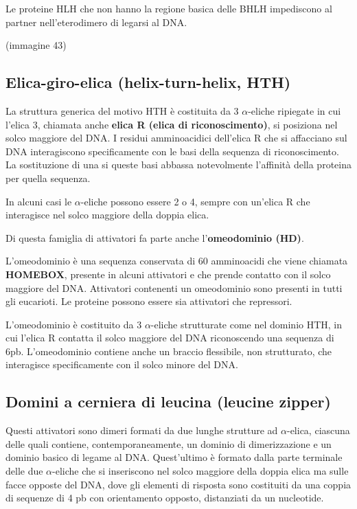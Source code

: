 \documentclass[11pt]{book}
\begin{document}
Le proteine HLH che non hanno la regione basica delle BHLH impediscono
al partner nell'eterodimero di legarsi al DNA.

(immagine 43)

\subsection{Elica-giro-elica (helix-turn-helix,
HTH)}\label{elica-giro-elica-helix-turn-helix-hth}

La struttura generica del motivo HTH è costituita da 3 \(\alpha\)-eliche
ripiegate in cui l'elica 3, chiamata anche \textbf{elica R (elica di
riconoscimento)}, si posiziona nel solco maggiore del DNA. I residui
amminoacidici dell'elica R che si affacciano sul DNA interagiscono
specificamente con le basi della sequenza di riconoscimento. La
sostituzione di una si queste basi abbassa notevolmente l'affinità della
proteina per quella sequenza.

In alcuni casi le \(\alpha\)-eliche possono essere 2 o 4, sempre con
un'elica R che interagisce nel solco maggiore della doppia elica.

Di questa famiglia di attivatori fa parte anche l'\textbf{omeodominio
(HD)}.

L'omeodominio è una sequenza conservata di 60 amminoacidi che viene
chiamata \textbf{HOMEBOX}, presente in alcuni attivatori e che prende
contatto con il solco maggiore del DNA. Attivatori contenenti un
omeodominio sono presenti in tutti gli eucarioti. Le proteine possono
essere sia attivatori che repressori.

L'omeodominio è costituito da 3 \(\alpha\)-eliche strutturate come nel
dominio HTH, in cui l'elica R contatta il solco maggiore del DNA
riconoscendo una sequenza di 6pb. L'omeodominio contiene anche un
braccio flessibile, non strutturato, che interagisce specificamente con
il solco minore del DNA.

\subsection{Domini a cerniera di leucina (leucine
zipper)}\label{domini-a-cerniera-di-leucina-leucine-zipper}

Questi attivatori sono dimeri formati da due lunghe strutture ad
\(\alpha\)-elica, ciascuna delle quali contiene, contemporaneamente, un
dominio di dimerizzazione e un dominio basico di legame al DNA.
Quest'ultimo è formato dalla parte terminale delle due \(\alpha\)-eliche
che si inseriscono nel solco maggiore della doppia elica ma sulle facce
opposte del DNA, dove gli elementi di risposta sono costituiti da una
coppia di sequenze di 4 pb con orientamento opposto, distanziati da un
nucleotide.
\end{document}
